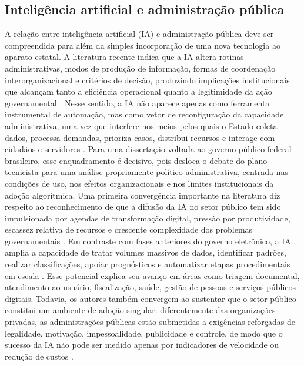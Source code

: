\documentclass[12pt,a4paper]{article}
\begin{document}
\subsection{Inteligência artificial e administração pública}
\label{sec:orgd4e6e66}
A relação entre inteligência artificial (IA) e administração pública deve ser compreendida para além da simples incorporação de uma nova tecnologia ao aparato estatal. A literatura recente indica que a IA altera rotinas administrativas, modos de produção de informação, formas de coordenação interorganizacional e critérios de decisão, produzindo implicações institucionais que alcançam tanto a eficiência operacional quanto a legitimidade da ação governamental \autocite{madan2022ai} \autocite{criado2024artificial}. Nesse sentido, a IA não aparece apenas como ferramenta instrumental de automação, mas como vetor de reconfiguração da capacidade administrativa, uma vez que interfere nos meios pelos quais o Estado coleta dados, processa demandas, prioriza casos, distribui recursos e interage com cidadãos e servidores \autocite{pi2021machine} \autocite{serra2024a}. Para uma dissertação voltada ao governo público federal brasileiro, esse enquadramento é decisivo, pois desloca o debate do plano tecnicista para uma análise propriamente político-administrativa, centrada nas condições de uso, nos efeitos organizacionais e nos limites institucionais da adoção algorítmica.
Uma primeira convergência importante na literatura diz respeito ao reconhecimento de que a difusão da IA no setor público tem sido impulsionada por agendas de transformação digital, pressão por produtividade, escassez relativa de recursos e crescente complexidade dos problemas governamentais \autocite{madan2022ai} \autocite{alhosani2024opportunities}. Em contraste com fases anteriores do governo eletrônico, a IA amplia a capacidade de tratar volumes massivos de dados, identificar padrões, realizar classificações, apoiar prognósticos e automatizar etapas procedimentais em escala \autocite{pi2021machine} \autocite{lyrio2025emerging}. Esse potencial explica seu avanço em áreas como triagem documental, atendimento ao usuário, fiscalização, saúde, gestão de pessoas e serviços públicos digitais. Todavia, os autores também convergem ao sustentar que o setor público constitui um ambiente de adoção singular: diferentemente das organizações privadas, as administrações públicas estão submetidas a exigências reforçadas de legalidade, motivação, impessoalidade, publicidade e controle, de modo que o sucesso da IA não pode ser medido apenas por indicadores de velocidade ou redução de custos \autocite{parycek2023artificial} \autocite{criado2024artificial}.
\end{document}
